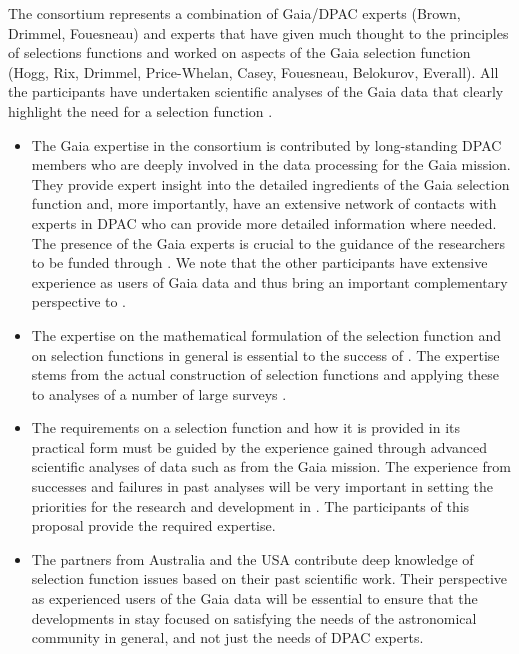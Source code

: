 The consortium represents a combination of Gaia/DPAC experts (Brown, Drimmel, Fouesneau) and experts that have given much thought to the principles of selections functions and worked on aspects of the Gaia selection function (Hogg, Rix, Drimmel, Price-Whelan, Casey, Fouesneau, Belokurov, Everall). All the participants have undertaken scientific analyses of the Gaia data that clearly highlight the need for a selection function \citep[e.g.,][]{Eilers2019a,ElBadry2019,ApwGD12018}.
\begin{itemize}
    \item The Gaia expertise in the consortium is contributed by long-standing DPAC members who are deeply involved in the data processing for the Gaia mission. They provide expert insight into the detailed ingredients of the Gaia selection function and, more importantly, have an extensive network of contacts with experts in DPAC who can provide more detailed information where needed. The presence of the Gaia experts is crucial to the guidance of the researchers to be funded through {\acro}. We note that the other participants have extensive experience as users of Gaia data and thus bring an important complementary perspective to {\acro}.
    \item The expertise on the mathematical formulation of the selection function and on selection functions in general is essential to the success of {\acro}. The expertise stems from the actual construction of selection functions and applying these to analyses of a number of large surveys \citep[e.g.,][]{2012ApJ...753..148B, ElBadry2019, Eilers2019a, EverallDas2020}.
    \item The requirements on a selection function and how it is provided in its practical form must be guided by the experience gained through advanced scientific analyses of data such as from the Gaia mission. The experience from successes and failures in past analyses will be very important in setting the priorities for the research and development in {\acro}. The participants of this proposal provide the required expertise.
    \item The partners from Australia and the USA contribute deep knowledge of selection function issues based on their past scientific work. Their perspective as experienced users of the Gaia data will be essential to ensure that the developments in {\acro} stay focused on satisfying the needs of the astronomical community in general, and not just the needs of DPAC experts.
\end{itemize}

